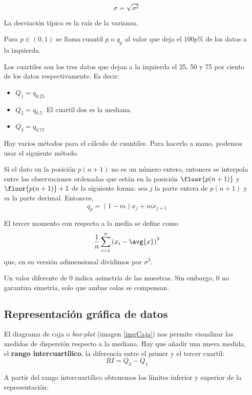 \documentclass{apuntes}
\begin{document}
\begin{defn}
\[\sigma = \sqrt{\sigma^2} \]

La desviación típica es la raíz de la varianza.
\end{defn}

\begin{defn}[Cuantil]
Para $p\in (0, 1)$ se llama cuantil $p$ o $q_p$ al valor que deja el $100p \%$ de los datos a la izquierda.
\end{defn}

\begin{defn}[Cuartil]
Los cuartiles son los tres datos que dejan a la izquierda el 25, 50 y 75 por ciento de los datos respectivamente. Es decir:

\begin{itemize}
\item $Q_1 = q_{0.25}$
\item $Q_2 = q_{0.5}$. El cuartil dos es la mediana.
\item $Q_3 = q_{0.75}$
\end{itemize}
\end{defn}

Hay varios métodos para el cálculo de cuantiles. Para hacerlo a mano, podemos usar el siguiente método.

Si el dato en la posición $p(n+1)$ no es un número entero, entonces se interpola entre las observaciones ordenadas que están en la posición $\floor{p(n+1)}$ y $\floor{p(n+1)} + 1$ de la siguiente forma: sea $j$ la parte entera de $p(n+1)$ y $m$ la parte decimal. Entonces, \[ q_p = (1-m)x_j + m x_{j+1} \]


\begin{defn}
El tercer momento con respecto a la media se define como \[ \frac{1}{n}\sum_{i=1}^n\left(x_i-\avg{x}\right)^3 \] que, en su versión adimensional dividimos por $\sigma^3$.
\end{defn}

Un valor diferente de 0 indica asimetría de las muestras. Sin embargo, 0 no garantiza simetría, solo que ambas colas se compensan.

\subsection{Representación gráfica de datos}

\begin{defn}
El diagrama de caja o \textit{box-plot}  (imagen \ref{imgCaja}) nos permite visualizar las medidas de dispersión respecto a la mediana. Hay que añadir una nueva medida, el \textbf{rango intercuartílico}, la diferencia entre el primer y el tercer cuartil: \[RI = Q_3 - Q_1 \]

A partir del rango intercuartílico obtenemos los límites inferior y superior de la representación:

\end{defn}
\end{document}
